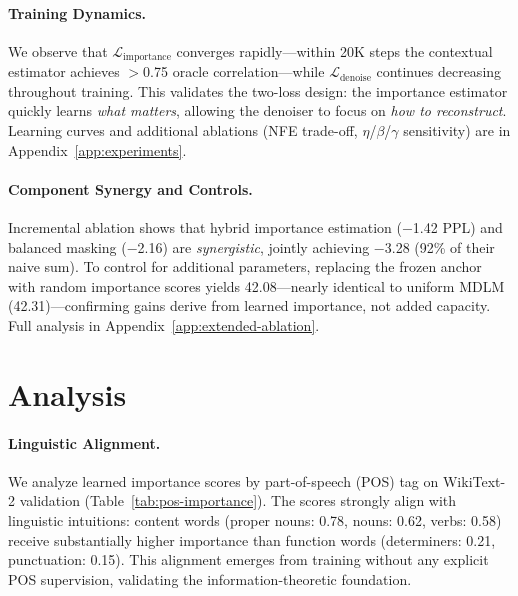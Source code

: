 \documentclass[11pt]{article}
\newcommand{\gL}{\mathcal{L}}
\theoremstyle{remark}
\begin{document}
\paragraph{Training Dynamics.} We observe that $\gL_{\text{importance}}$ converges rapidly---within 20K steps the contextual estimator achieves $>$0.75 oracle correlation---while $\gL_{\text{denoise}}$ continues decreasing throughout training. This validates the two-loss design: the importance estimator quickly learns \textit{what matters}, allowing the denoiser to focus on \textit{how to reconstruct}. Learning curves and additional ablations (NFE trade-off, $\eta$/$\beta$/$\gamma$ sensitivity) are in Appendix~\ref{app:experiments}.

\paragraph{Component Synergy and Controls.} Incremental ablation shows that hybrid importance estimation ($-$1.42 PPL) and balanced masking ($-$2.16) are \emph{synergistic}, jointly achieving $-$3.28 (92\% of their naive sum). To control for additional parameters, replacing the frozen anchor with random importance scores yields 42.08---nearly identical to uniform MDLM (42.31)---confirming gains derive from learned importance, not added capacity. Full analysis in Appendix~\ref{app:extended-ablation}.

\section{Analysis}
\label{sec:analysis}

\paragraph{Linguistic Alignment.} We analyze learned importance scores by part-of-speech (POS) tag on WikiText-2 validation (Table~\ref{tab:pos-importance}). The scores strongly align with linguistic intuitions: content words (proper nouns: 0.78, nouns: 0.62, verbs: 0.58) receive substantially higher importance than function words (determiners: 0.21, punctuation: 0.15). This alignment emerges from training without any explicit POS supervision, validating the information-theoretic foundation.
\end{document}
